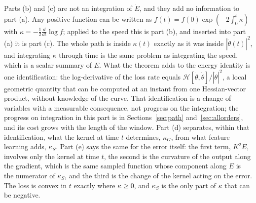 \documentclass[11pt]{article}
\theoremstyle{definition}
\theoremstyle{remark}
\newcommand{\Hess}{\mathcal{H}}          %
\begin{document}
Parts (b) and (c) are not an integration of $\dot E$, and they add no information to part (a).
Any positive function can be written as $f(t) = f(0)\exp(-2\int_0^t\kappa)$ with $\kappa = -\frac12\frac{d}{dt}\log f$; applied to the speed this is part (b), and inserted into part (a) it is part (c).
The whole path is inside $\kappa(t)$ exactly as it was inside $|\dot\theta(t)|^2$, and integrating $\kappa$ through time is the same problem as integrating the speed, which is a scalar summary of $\dot E$.
What the theorem adds to the energy identity is one identification: the log-derivative of the loss rate equals $\Hess[\dot\theta,\dot\theta]/|\dot\theta|^2$, a local geometric quantity that can be computed at an instant from one Hessian-vector product, without knowledge of the curve.
That identification is a change of variables with a measurable consequence, not progress on the integration; the progress on integration in this part is in Sections~\ref{sec:path} and~\ref{sec:allorders}, and its cost grows with the length of the window.
Part (d) separates, within that identification, what the kernel at time $t$ determines, $\kappa_G$, from what feature learning adds, $\kappa_S$.
Part (e) says the same for the error itself: the first term, $K^2E$, involves only the kernel at time $t$, the second is the curvature of the output along the gradient, which is the same sampled function whose component along $E$ is the numerator of $\kappa_S$, and the third is the change of the kernel acting on the error.
The loss is convex in $t$ exactly where $\kappa\ge0$, and $\kappa_S$ is the only part of $\kappa$ that can be negative.
\end{document}
